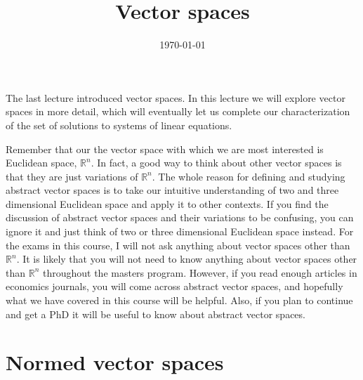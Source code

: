 \documentclass[12pt,reqno]{amsart}
\title{Vector spaces}
\date{\today}
\theoremstyle{definition}
\def\R{\mathbb{R}}
\begin{document}
\maketitle

The last lecture introduced vector spaces. In this lecture we will
explore vector spaces in more detail, which will eventually let us
complete our characterization of the set of solutions to systems of
linear equations. 

Remember that our the vector space with which we are most interested
is Euclidean space, $\R^n$. In fact, a good way to think about other
vector spaces is that they are just variations of $\R^n$. The whole
reason for defining and studying abstract vector spaces is to take our
intuitive understanding of two and three dimensional Euclidean space
and apply it to other contexts. If you find the discussion of abstract
vector spaces and their variations to be confusing, you can ignore it
and just think of two or three dimensional Euclidean space
instead. For the exams in this course, I will not ask anything about
vector spaces other than $\R^n$. It is likely that you will not need
to know anything about vector spaces other than $\R^n$ throughout the
masters program. However, if you read enough articles in economics
journals, you will come across abstract vector spaces, and hopefully
what we have covered in this course will be helpful. Also, if you plan
to continue and get a PhD it will be useful to know about abstract
vector spaces. 

\section{Normed vector spaces}
\end{document}

